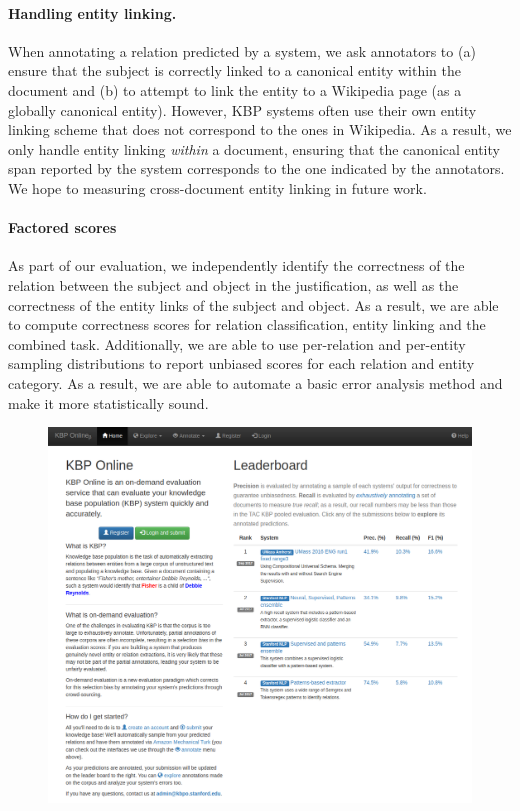 \paragraph{Handling entity linking.}
When annotating a relation predicted by a system, we ask annotators to (a) ensure that the subject is correctly linked to a canonical entity within the document and (b) to attempt to link the entity to a Wikipedia page (as a globally canonical entity).
However, KBP systems often use their own entity linking scheme that does not correspond to the ones in Wikipedia.
As a result, we only handle entity linking \textit{within} a document, ensuring that the canonical entity span reported by the system corresponds to the one indicated by the annotators.
We hope to measuring cross-document entity linking in future work.

\paragraph{Factored scores}
As part of our evaluation, we independently identify the correctness of the relation between the subject and object in the justification, as well as the correctness of the entity links of the subject and object.
As a result, we are able to compute correctness scores for relation classification, entity linking and the combined task.
Additionally, we are able to use per-relation and per-entity sampling distributions to report unbiased scores for each relation and entity category.
As a result, we are able to automate a basic error analysis method and make it more statistically sound.

\begin{figure}
  \centering
  \includegraphics[width=\textwidth]{figures/interface/leaderboard}
  \caption[KBP Online]{\label{fig:kbpo:kbpo}}
\end{figure}

